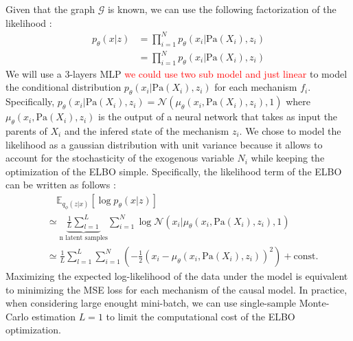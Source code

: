 \documentclass{article}
\newcommand\todo[1]{\textcolor{red}{#1}}
\begin{document}
Given that the graph $\mathcal{G}$ is known, we can use the following factorization of the likelihood :
\begin{align*}
    p_\theta(x | z) &= \prod_{i = 1}^N p_\theta(x_i | \text{Pa}(X_i), z_i) \\
    &= \prod_{i = 1}^N p_\theta(x_i | \text{Pa}(X_i), z_i)
\end{align*}
We will use a 3-layers MLP \todo{we could use two sub model and just linear} to model the conditional distribution $p_\theta(x_i | \text{Pa}(X_i), z_i)$ for each mechanism $f_i$. Specifically, $p_\theta(x_i | \text{Pa}(X_i), z_i) = \mathcal{N}(\mu_\theta(x_i, \text{Pa}(X_i), z_i), 1)$ where $\mu_\theta(x_i, \text{Pa}(X_i), z_i)$ is the output of a neural network that takes as input the parents of $X_i$ and the infered state of the mechanism $z_i$. We chose to model the likelihood as a gaussian distribution with unit variance because it allows to account for the stochasticity of the exogenous variable $N_i$ while keeping the optimization of the ELBO simple. Specifically, the likelihood term of the ELBO can be written as follows :
\begin{align*}
    & \quad \mathbb{E}_{q_\phi(z | x)} \left[ \log p_\theta(x | z) \right] \\ &\simeq \underbrace{\frac{1}{L} \sum_{l = 1}^L }_{\text{n latent samples}} \sum_{i = 1}^N \log \mathcal{N}(x_i | \mu_\theta(x_i, \text{Pa}(X_i), z_i), 1)\\
    &\simeq \frac{1}{L} \sum_{l = 1}^L \sum_{i = 1}^N \left( -\frac{1}{2} \left( x_i - \mu_\theta(x_i, \text{Pa}(X_i), z_i) \right)^2 \right) + \text{const.}
\end{align*}
Maximizing the expected log-likelihood of the data under the model is equivalent to minimizing the MSE loss for each mechanism of the causal model. In practice, when considering large enought mini-batch, we can use single-sample Monte-Carlo estimation $L=1$ to limit the computational cost of the ELBO optimization.
\end{document}
